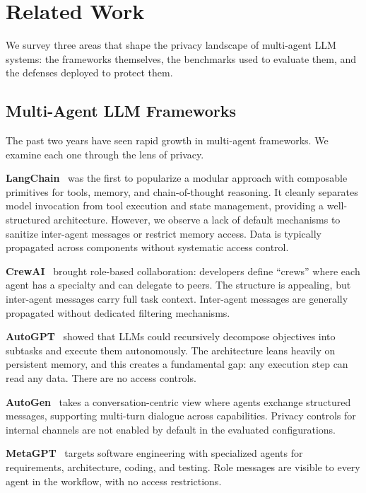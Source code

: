 \documentclass{ieeeaccess}
\begin{document}
\section{Related Work}
\label{sec:related}

We survey three areas that shape the privacy landscape of multi-agent LLM systems: the frameworks themselves, the benchmarks used to evaluate them, and the defenses deployed to protect them.

\subsection{Multi-Agent LLM Frameworks}

The past two years have seen rapid growth in multi-agent frameworks. We examine each one through the lens of privacy.

\textbf{LangChain}~\cite{langchain2023} was the first to popularize a modular approach with composable primitives for tools, memory, and chain-of-thought reasoning. It cleanly separates model invocation from tool execution and state management, providing a well-structured architecture. However, we observe a lack of default mechanisms to sanitize inter-agent messages or restrict memory access. Data is typically propagated across components without systematic access control.

\textbf{CrewAI}~\cite{crewai2024} brought role-based collaboration: developers define ``crews'' where each agent has a specialty and can delegate to peers. The structure is appealing, but inter-agent messages carry full task context. Inter-agent messages are generally propagated without dedicated filtering mechanisms.

\textbf{AutoGPT}~\cite{autogpt2023} showed that LLMs could recursively decompose objectives into subtasks and execute them autonomously. The architecture leans heavily on persistent memory, and this creates a fundamental gap: any execution step can read any data. There are no access controls.

\textbf{AutoGen}~\cite{wu2023autogenenablingnextgenllm} takes a conversation-centric view where agents exchange structured messages, supporting multi-turn dialogue across capabilities. Privacy controls for internal channels are not enabled by default in the evaluated configurations.

\textbf{MetaGPT}~\cite{hong2024metagptmetaprogrammingmultiagent} targets software engineering with specialized agents for requirements, architecture, coding, and testing. Role messages are visible to every agent in the workflow, with no access restrictions.
\end{document}
